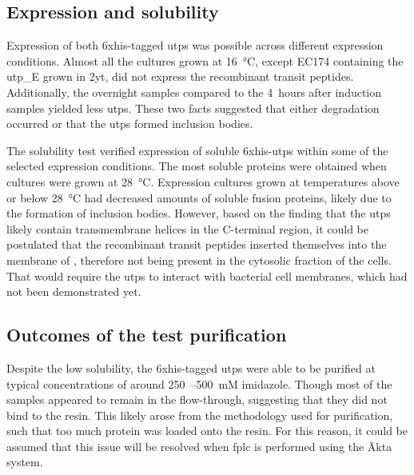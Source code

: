 \subsection{Expression and solubility}
Expression of both \gls{6xhis}-tagged \gls{utp}s was possible across different expression conditions. Almost all the cultures grown at 16~°C, except EC174 containing the \gls{utp_E} grown in \gls{2yt}, did not express the recombinant transit peptides. Additionally, the overnight samples compared to the 4~hours after induction samples yielded less \gls{utp}s. These two facts suggested that either degradation occurred or that the \gls{utp}s formed inclusion bodies.  

The solubility test verified expression of soluble \gls{6xhis}-\gls{utp}s within some of the selected expression conditions. The most soluble proteins were obtained when cultures were grown at 28~°C. Expression cultures grown at temperatures above or below 28~°C had decreased amounts of soluble fusion proteins, likely due to the formation of inclusion bodies. However, based on the finding that the \gls{utp}s likely contain transmembrane helices in the C-terminal region, it could be postulated that the recombinant transit peptides inserted themselves into the membrane of , therefore not being present in the cytosolic fraction of the cells. That would require the \gls{utp}s to interact with bacterial cell membranes, which had not been demonstrated yet.   
\subsection{Outcomes of the test purification}
Despite the low solubility, the \gls{6xhis}-tagged \gls{utp}s were able to be purified at typical concentrations of around 250~--500~mM imidazole. Though most of the samples appeared to remain in the flow-through, suggesting that they did not bind to the resin. This likely arose from the methodology used for purification, such that too much protein was loaded onto the resin. For this reason, it could be assumed that this issue will be resolved when \gls{fplc} is performed using the Äkta system. 

